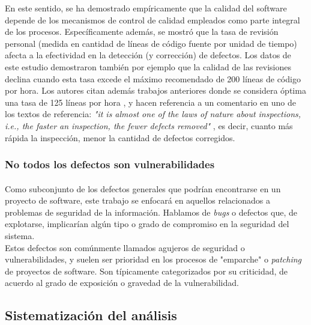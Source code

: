 \documentclass[11pt,a4paper]{article}
\begin{document}
En este sentido, se ha demostrado empíricamente \cite{Kem1} que la calidad del software depende de los mecanismos de control de calidad empleados como parte integral de los procesos. Específicamente además, se mostró que la tasa de revisión personal (medida en cantidad de líneas de código fuente por unidad de tiempo) afecta a la efectividad en la detección (y corrección) de defectos. Los datos de este estudio demostraron también por ejemplo que la calidad de las revisiones declina cuando esta tasa excede el máximo recomendado de 200 líneas de código por hora. Los autores citan además trabajos anteriores donde se considera óptima una tasa de 125 líneas por hora \cite{Buck1}, y hacen referencia a un comentario en uno de los textos de referencia: \textit{"it is almost one of the laws of nature about inspections, i.e., the faster an inspection, the fewer defects removed"} \cite{Rad1}, es decir, cuanto más rápida la inspección, menor la cantidad de defectos corregidos.
\\

\subsubsection{No todos los defectos son vulnerabilidades}

\paragraph{}Como subconjunto de los defectos generales que podrían encontrarse en un proyecto de software, este trabajo se enfocará en aquellos relacionados a problemas de seguridad de la información. Hablamos de \textit{bugs} o defectos que, de explotarse, implicarían algún tipo o grado de compromiso en la seguridad del sistema.
\\

Estos defectos son comúnmente llamados agujeros de seguridad o vulnerabilidades, y suelen ser prioridad en los procesos de "emparche" o \textit{patching} de proyectos de software. Son típicamente categorizados por su criticidad, de acuerdo al grado de exposición o gravedad de la vulnerabilidad.
\\

\subsection{Sistematización del análisis}
\end{document}

